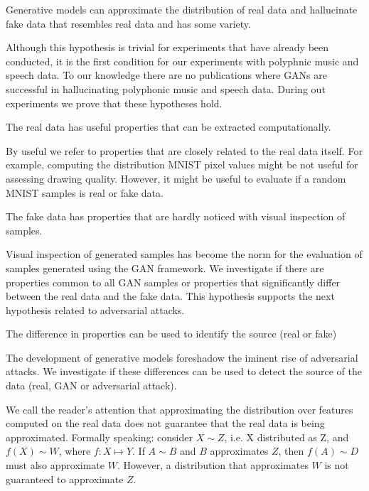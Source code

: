 \begin{hyp} \label{hyp:generate}
Generative models can approximate the distribution of real data and hallucinate
fake data that resembles real data and has some variety. 
\end{hyp}

Although this hypothesis is trivial for experiments that have already been
conducted, it is the first condition for our experiments with polyphnic music
and speech data. To our knowledge there are no publications where GANs are 
successful in hallucinating polyphonic music and speech data. During out 
experiments we prove that these hypotheses hold.

\begin{hyp} \label{hyp:features}
The real data has useful properties that can be extracted computationally.
\end{hyp}
By useful we refer to properties that are closely related to the real data
itself. For example, computing the distribution MNIST pixel values might be not
useful for assessing drawing quality. However, it might be useful to evaluate
if a random MNIST samples is real or fake data.

\begin{hyp} \label{hyp:visual}
The fake data has properties that are hardly noticed with visual inspection of
samples.
\end{hyp}
Visual inspection of generated samples has become the norm for the evaluation of
samples generated using the GAN framework. We investigate if there are
properties common to all GAN samples or properties that significantly differ
between the real data and the fake data. 
This hypothesis supports the next hypothesis related to adversarial attacks. 

\begin{hyp} \label{hyp:difference}
The difference in properties can be used to identify the source (real or fake)
\end{hyp}
The development of generative models foreshadow the iminent
rise of adversarial attacks. We investigate if these differences can be used to
detect the source of the data (real, GAN or adversarial attack). 

We call the reader's attention that approximating the distribution over features
computed on the real data does not guarantee that the real data is being
approximated. Formally speaking:
consider $X \sim Z$, i.e. X distributed as Z, and $f(X) \sim W$, where $f: X
\mapsto Y$.
If $A \sim B$ and $B$ approximates $Z$, then $f(A) \sim D$ must also approximate $W$.
However, a distribution that approximates $W$ is not guaranteed to approximate
$Z$.


